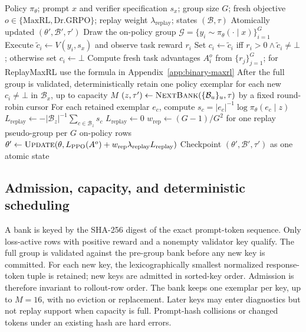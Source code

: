 \documentclass{article}
\newcommand{\1}{\mathbf 1}
\theoremstyle{remark}
\theoremstyle{definition}
\theoremstyle{plain}
\begin{document}
\begin{algorithm}[H]
  \caption{One ReplayMaxRL optimizer update}
  \label{alg:verified-replay-update}
  \small
  \begin{algorithmic}[1]
    \REQUIRE Policy $\pi_\theta$; prompt $x$ and verifier specification
      $s_x$; group size $G$; fresh objective $o\in\{\mathrm{MaxRL},\mathrm{Dr.GRPO}\}$; replay weight $\lambda_{\mathrm{replay}}$;
      states $(\mathcal B,\tau)$
    \ENSURE Atomically updated $(\theta',\mathcal B',\tau')$
    \STATE Draw the on-policy group
      $\mathcal G=\{y_i\sim\pi_\theta(\cdot\mid x)\}_{i=1}^G$
      \STATE Execute $\widetilde c_i\gets V(y_i,s_x)$ and observe task
        reward $r_i$
      \STATE Set $c_i\gets\widetilde c_i$ iff
        $r_i>0\wedge\widetilde c_i\ne\bot$; otherwise set $c_i\gets\bot$
    \ENDFOR
    \STATE Compute fresh task advantages $A_i^{o}$ from $\{r_j\}_{j=1}^G$; for ReplayMaxRL use the formula in Appendix~\ref{app:binary-maxrl}
    \STATE After the full group is validated, deterministically retain one
      policy exemplar for each new $c_i\ne\bot$ in $\mathcal B_x$, up to
      capacity $M$
    \STATE $(z,\tau')\gets\textsc{NextBank}
      (\{\mathcal B_u\}_u,\tau)$ by a fixed round-robin cursor
      \STATE For each retained exemplar $e_c$, compute
        $s_c=|e_c|^{-1}\log\pi_\theta(e_c\mid z)$
      \STATE $L_{\mathrm{replay}}\gets-|\mathcal B_z|^{-1}
        \sum_{c\in\mathcal B_z}s_c$
    \ELSE
      \STATE $L_{\mathrm{replay}}\gets0$
    \ENDIF
    \STATE $w_{\mathrm{rep}}\gets(G-1)/G^2$ for one replay
      pseudo-group per $G$ on-policy rows
    \STATE $\theta'\gets\textsc{Update}
      (\theta,L_{\mathrm{PPO}}(A^{o})
      +w_{\mathrm{rep}}\lambda_{\mathrm{replay}}L_{\mathrm{replay}})$
    \STATE Checkpoint $(\theta',\mathcal B',\tau')$ as one atomic state
\end{algorithmic}
\end{algorithm}

\subsection{Admission, capacity, and deterministic scheduling}
\label{app:algorithm-bank}

A bank is keyed by the SHA-256 digest of the exact prompt-token sequence.
Only loss-active rows with positive reward and a nonempty validator key
qualify. The full group is validated against the pre-group bank before
any new key is committed. For each new key, the lexicographically smallest
normalized response-token tuple is retained; new keys are admitted in
sorted-key order. Admission is therefore invariant to rollout-row order.
The bank keeps one exemplar per key, up to $M=16$, with no eviction or
replacement. Later keys may enter diagnostics but not replay support when
capacity is full. Prompt-hash collisions or changed tokens under an
existing hash are hard errors.
\end{document}
